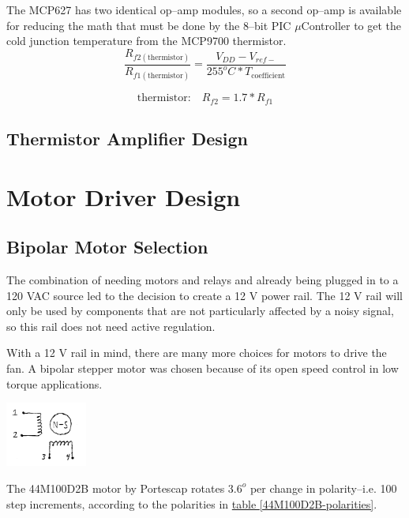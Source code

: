 \documentclass[10pt, twocolumn]{article}
\begin{document}
The MCP627 has two identical op--amp modules, so a second op--amp is available
for reducing the math that must be done by the 8--bit PIC $\mu$Controller to
get the cold junction temperature from the MCP9700 thermistor.
\begin{equation*}
\frac{R_{f2(\textrm{thermistor})}}{R_{f1(\textrm{thermistor})}}=
\frac{V_{DD}-V_{ref-}}{255^{o}C*T_{\textrm{coefficient}}}
\end{equation*}

\begin{equation}
\textrm{thermistor:}\quad R_{f2}=1.7*R_{f1}
\label{thermistor-feedback-ratio-eq}
\end{equation}

\subsection{Thermistor Amplifier Design}

\section{Motor Driver Design}

\subsection{Bipolar Motor Selection}

The combination of needing motors and relays and already being plugged in to a 
120 VAC source led to the decision to create a 12 V power rail. The 12 V rail
will only be used by components that are not particularly affected by a noisy
signal, so this rail does not need active regulation.

With a 12 V rail in mind, there are many more choices for motors to drive the fan.
A bipolar stepper motor was chosen because of its open speed control in low torque applications.

\begin{center}
	\includegraphics[width=0.2\textwidth]{Figures/bipolar-motor.pdf}
\end{center}

The 44M100D2B motor by Portescap rotates $3.6^{o}$ per change in polarity--i.e. 100 step increments,
according to the polarities in
\hyperref[44M100D2B-polarities]{table \ref{44M100D2B-polarities}}.
\end{document}
